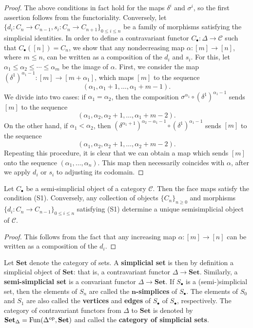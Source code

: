 \begin{proof}
The above conditions in fact hold for the maps $\delta^i$ and $\sigma^i$, so the first assertion follows from the functoriality. Conversely, let $\{d_i:C_n\to C_{n-1},s_i:C_n\to C_{n+1}\}_{0\leq i\leq n}$ be a family of morphisms satisfying the simplicial identities. In order to define a contravariant functor $C_\bullet:\Delta\to\mathcal{C}$ such that $C_\bullet([n])=C_n$, we show that any nondecreasing map $\alpha:[m]\to[n]$, where $m\leq n$, can be written as a composition of the $d_i$ and $s_i$. For this, let $\alpha_1\leq\alpha_2\leq\cdots\leq\alpha_m$ be the image of $\alpha$. First, we consider the map $(\delta^1)^{\alpha_1-1}:[m]\to[m+\alpha_1]$, which maps $[m]$ to the sequence
\[(\alpha_1,\alpha_1+1,\dots,\alpha_1+m-1).\]
We divide into two cases: if $\alpha_1=\alpha_2$, then the composition $\sigma^{\alpha_1}\circ(\delta^1)^{\alpha_1-1}$ sends $[m]$ to the sequence
\[(\alpha_1,\alpha_2,\alpha_2+1,\dots,\alpha_1+m-2).\]
On the other hand, if $\alpha_1<\alpha_2$, then $(\delta^{\alpha_1+1})^{\alpha_2-\alpha_1-1}\circ (\delta^1)^{\alpha_1-1}$ sends $[m]$ to the sequence
\[(\alpha_1,\alpha_2,\alpha_2+1,\dots,\alpha_2+m-2).\]
Repeating this procedure, it is clear that we can obtain a map which sends $[m]$ onto the sequence $(\alpha_1,\dots,\alpha_n)$. This map then necessarily coincides with $\alpha$, after we apply $d_i$ or $s_i$ to adjusting its codomain. 
\end{proof}
\begin{corollary}\label{semi-simplicial set face map char}
Let $C_\bullet$ be a semi-simplicial object of a category $\mathcal{C}$. Then the face maps satisfy the condition (S1). Conversely, any collection of objects $\{C_n\}_{n\geq 0}$ and morphisms $\{d_i:C_n\to C_{n-1}\}_{0\leq i\leq n}$ satisfying (S1) determine a unique semisimplicial object of $\mathcal{C}$.
\end{corollary}
\begin{proof}
This follows from the fact that any increasing map $\alpha:[m]\to[n]$ can be written as a composition of the $d_i$.
\end{proof}
Let $\mathbf{Set}$ denote the category of sets. A \textbf{simplicial set} is then by definition a simplicial object of $\mathbf{Set}$: that is, a contravariant functor $\Delta\to\mathbf{Set}$. Similarly, a \textbf{semi-simplicial set} is a convariant functor $\Delta\to\mathbf{Set}$. If $S_\bullet$ is a (semi-)simplicial set, then the elements of $S_n$ are called the \textbf{$\bm{n}$-simplices} of $S_\bullet$. The elements of $S_0$ and $S_1$ are also called the \textbf{vertices} and \textbf{edges} of $S_\bullet$ of $S_\bullet$, respectively. The category of contravariant functors from $\Delta$ to $\mathbf{Set}$ is denoted by $\mathbf{Set}_\Delta=\mathrm{Fun}(\Delta^{\mathrm{op}},\mathbf{Set})$ and called the \textbf{category of simplicial sets}.
